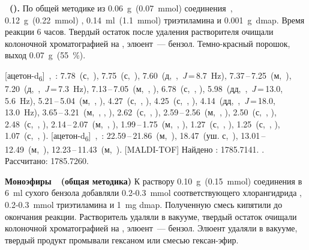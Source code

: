 \textbf{~().}
По общей методике из \SI{0.06}{\gram}~(\SI{0.07}{\milli\mole}) соединения~, \SI{0.12}{\gram}~(\SI{0.22}{\milli\mole}) , \SI{0.14}{\milli\litre}~(\SI{1.1}{\milli\mole}) триэтиламина и \SI{0.001}{\gram}~\ac{dmap}.
Время реакции 6 часов. Твердый остаток после удаления растворителя очищали колоночной хроматографией на , элюент~--- бензол.
Темно-красный порошок, выход \SI{0.07}{\gram}~(\SI{55}{\percent}). 
\begin{experimental}
    [ацетон-d\textsubscript{6}]~\chemdelta,~\si{\ppm}: 7.78~(с,~), 7.75~(с,~), 7.60~(д,~,~\textit{J}\,=\,8.7~\si{\hertz}), 7.37\,--\,7.25~(м,~), 7.20~(д,~,~\textit{J}\,=\,7.3~\si{\hertz}), 7.13\,--\,7.05~(м,~, ), 6.78~(с,~, ), 5.98~(дд,~,~\textit{J}\,=\,13.0, 5.6~\si{\hertz}), 5.21\,--\,5.04~(м,~, ), 4.27~(с,~, ), 4.25~(с,~, ), 4.14~(дд,~,~\textit{J}\,=\,18.0, 13.0~\si{\hertz}), 3.65\,--\,3.21~(м,~, , ), 2.62~(с,~, ), 2.59\,--\,2.56~(м,~, ), 2.50~(с,~, ), 2.48~(с,~, ), 2.14\,--\,2.07~(м,~, ), 1.99\,--\,1.75~(м,~, ), 1.27~(с,~, ), 1.25~(с,~, ), 1.07~(с,~, ).
    [ацетон-d\textsubscript{6}]~\chemdelta,~\si{\ppm}: 22.59\,--\,21.86~(м,~), 18.47~(уш. с,~), 13.01\,--\,12.49~(м,~), 12.23\,--\,11.43~(м,~).
    [MALDI-TOF] Найдено \ce{[M + H]+}: \num{1785.7141}. . Рассчитано: \ce{[M + H]} \num{1785.7260}.
\end{experimental}

\textbf{Моноэфиры~~(общая методика)}
К раствору \SI{0.10}{\gram}~(\SI{0.15}{\milli\mole}) соединения  в \SI{6}{\milli\litre} сухого бензола добавляли 0.2-0.3~\si{\milli\mole} соответствующего хлорангидрида , 0.2-0.3~\si{\milli\mole} триэтиламина и \SI{1}{\milli\gram} \ac{dmap}.
Полученную смесь кипятили до окончания реакции.
Растворитель удаляли в вакууме, твердый остаток очищали колоночной хроматографией на , элюент~--- бензол.
Элюент удаляли в вакууме, твердый продукт промывали гексаном или смесью гексан-эфир.

